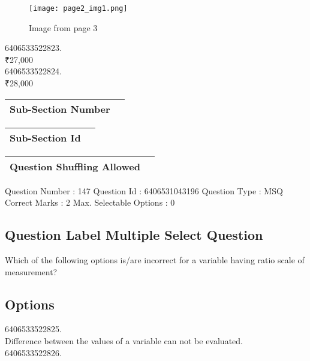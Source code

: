 \documentclass{article}
\begin{document}
\begin{figure}[h]
\centering
\texttt{[image: page2\_img1.png]}
\caption{Image from page 3}
\end{figure}

6406533522823.\\

₹27,000\\

6406533522824.\\

₹28,000\\

\begin{longtable}{|c|c|}
\hline
\textbf{Sub-Section Number} & \textbf{} \\ \hline
\end{longtable}

\begin{longtable}{|c|c|}
\hline
\textbf{Sub-Section Id} & \textbf{} \\ \hline
\end{longtable}

\begin{longtable}{|c|c|}
\hline
\textbf{Question Shuffling Allowed} & \textbf{} \\ \hline
\end{longtable}

Question Number : 147 Question Id : 6406531043196 Question Type : MSQ\\

Correct Marks : 2 Max. Selectable Options : 0\\

\subsection{Question Label  Multiple Select Question}

Which of the following options is/are incorrect for a variable having ratio scale of measurement?\\

\subsection{Options }

6406533522825.\\

Difference between the values of a variable can not be evaluated.\\

6406533522826.\\
\end{document}
